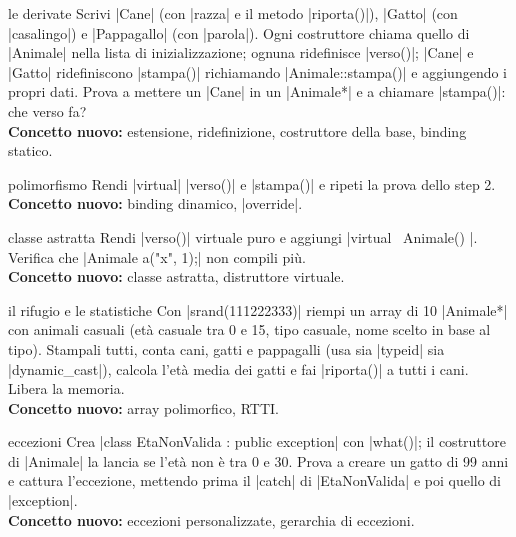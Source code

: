 \begin{step}{le derivate}
Scrivi \cc|Cane| (con \cc|razza| e il metodo \cc|riporta()|), \cc|Gatto| (con
\cc|casalingo|) e \cc|Pappagallo| (con \cc|parola|). Ogni costruttore chiama quello di
\cc|Animale| nella lista di inizializzazione; ognuna ridefinisce \cc|verso()|; \cc|Cane|
e \cc|Gatto| ridefiniscono \cc|stampa()| richiamando \cc|Animale::stampa()| e aggiungendo
i propri dati. Prova a mettere un \cc|Cane| in un \cc|Animale*| e a chiamare
\cc|stampa()|: che verso fa?\\[0.3em]
\textbf{Concetto nuovo:} estensione, ridefinizione, costruttore della base, binding statico.
\end{step}

\begin{step}{polimorfismo}
Rendi \cc|virtual| \cc|verso()| e \cc|stampa()| e ripeti la prova dello step 2.\\[0.3em]
\textbf{Concetto nuovo:} binding dinamico, \cc|override|.
\end{step}

\begin{step}{classe astratta}
Rendi \cc|verso()| virtuale puro e aggiungi \cc|virtual ~Animale() {}|. Verifica che
\cc|Animale a("x", 1);| non compili più.\\[0.3em]
\textbf{Concetto nuovo:} classe astratta, distruttore virtuale.
\end{step}

\begin{step}{il rifugio e le statistiche}
Con \cc|srand(111222333)| riempi un array di 10 \cc|Animale*| con animali casuali (età
casuale tra 0 e 15, tipo casuale, nome scelto in base al tipo). Stampali tutti, conta
cani, gatti e pappagalli (usa sia \cc|typeid| sia \cc|dynamic_cast|), calcola l'età
media dei gatti e fai \cc|riporta()| a tutti i cani. Libera la memoria.\\[0.3em]
\textbf{Concetto nuovo:} array polimorfico, RTTI.
\end{step}

\begin{step}{eccezioni}
Crea \cc|class EtaNonValida : public exception| con \cc|what()|; il costruttore di
\cc|Animale| la lancia se l'età non è tra 0 e 30. Prova a creare un gatto di 99 anni e
cattura l'eccezione, mettendo prima il \cc|catch| di \cc|EtaNonValida| e poi quello di
\cc|exception|.\\[0.3em]
\textbf{Concetto nuovo:} eccezioni personalizzate, gerarchia di eccezioni.
\end{step}

